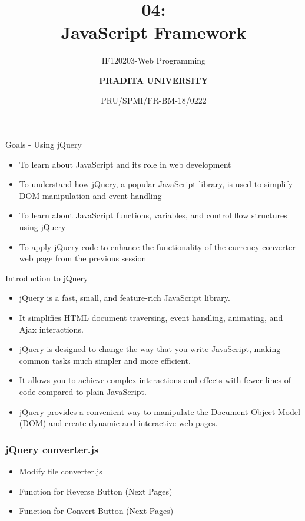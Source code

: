 \documentclass[aspectratio=169, table]{beamer}
\subtitle{IF120203-Web Programming}
\title{\Huge {\textbf{04: \\JavaScript Framework}}}
\date[Serial]{\scriptsize {PRU/SPMI/FR-BM-18/0222}}
\author[Pradita]{\small {\textbf{PRADITA UNIVERSITY}}}
\begin{document}
\begin{frame}
    \titlepage
\end{frame}

\begin{frame}{Goals - Using jQuery}
    \vskip-1cm
    \begin{itemize}
        \item To learn about JavaScript and its role in web development
        \item To understand how jQuery, a popular JavaScript library, is used to simplify DOM manipulation and event handling
        \item To learn about JavaScript functions, variables, and control flow structures using jQuery
        \item To apply jQuery code to enhance the functionality of the currency converter web page from the previous session
    \end{itemize}
\end{frame}

\begin{frame}{Introduction to jQuery}
    \vskip-0cm
    \begin{itemize}
        \item jQuery is a fast, small, and feature-rich JavaScript library.
        \item It simplifies HTML document traversing, event handling, animating, and Ajax interactions.
        \item jQuery is designed to change the way that you write JavaScript, making common tasks much simpler and more efficient.
        \item It allows you to achieve complex interactions and effects with fewer lines of code compared to plain JavaScript.
        \item jQuery provides a convenient way to manipulate the Document Object Model (DOM) and create dynamic and interactive web pages.
    \end{itemize}
\end{frame}



\begin{frame}[fragile]
    \frametitle{jQuery converter.js}
    \begin{itemize}
        \item Modify file converter.js
        \item Function for Reverse Button (Next Pages)
        \item Function for Convert Button (Next Pages)
    \end{itemize}
\end{frame}
\end{document}
